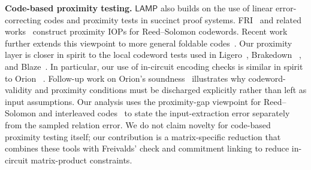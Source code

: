\documentclass[conference,compsoc]{IEEEtran}
\newcommand{\protocol}{\textsf{LAMP}}   %
\theoremstyle{plain}
\theoremstyle{definition}
\theoremstyle{remark}
\providecommand{\DIFaddtex}[1]{{\protect\color{DIFADD} \sf #1}} %
\providecommand{\DIFaddbegin}{} %
\providecommand{\DIFaddend}{} %
\providecommand{\DIFadd}[1]{\texorpdfstring{\DIFaddtex{#1}}{#1}} %
\providecommand{\DIFaddincludegraphics}[2][]{{\color{blue}\fbox{\DIFOincludegraphics[#1]{#2}}}} %
\DeclareRobustCommand{\DIFaddbegin}{\DIFOaddbegin \let\includegraphics\DIFaddincludegraphics} %
\DeclareRobustCommand{\DIFaddend}{\DIFOaddend \let\includegraphics\DIFOincludegraphics} %
\begin{document}
\noindent\textbf{Code-based proximity testing.}
\(\protocol\) also builds on the use of linear error-correcting codes and proximity
tests in succinct proof systems. FRI~\cite{FRI} and related
works~\cite{STIR,WHIR} construct proximity IOPs for
Reed--Solomon codewords. Recent work further extends this viewpoint to more
general foldable codes~\cite{basefold}.
Our proximity layer is closer in spirit to the local codeword tests used in
Ligero~\cite{Ligero}, Brakedown~ \DIFaddbegin \DIFadd{\cite{golovnev2023brakedown}}\DIFaddend , and
Blaze~\cite{blaze}. In particular, our use of in-circuit encoding checks is
similar in spirit to Orion~\cite{orion} . \DIFaddbegin \DIFadd{Follow-up work on Orion's
soundness~\cite{restoring_orion} illustrates why codeword-validity and
proximity conditions must be discharged explicitly rather than left as input
assumptions.  Our analysis uses the proximity-gap viewpoint for
Reed--Solomon and interleaved codes~\cite{bensasson2023proximity,diamond2024interleaved}
to state the input-extraction error separately from the sampled relation error.
We do not claim novelty for code-based proximity testing itself;
our contribution is a matrix-specific reduction that combines these tools with
Freivalds' check and commitment linking to reduce in-circuit matrix-product
constraints.
}\DIFaddend 

\end{document}

